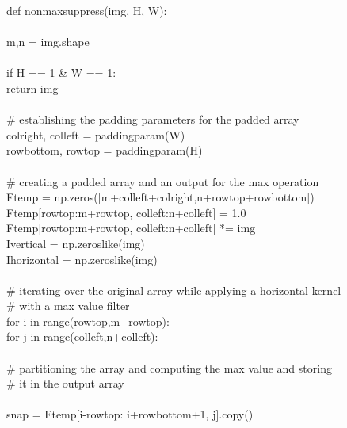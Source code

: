 \documentclass{article}
\begin{document}
	\noindent def non\textunderscore max\textunderscore suppress(img, H, W):\\
	\\
	\indent m,n = img.shape\\
	\\
	\indent if H == 1 \& W == 1:\\
	\indent \indent return img\\
	\\
	\indent \# establishing the padding parameters for the padded array\\   
	\indent col\textunderscore right, col\textunderscore left = padding\textunderscore param(W)\\
	\indent row\textunderscore bottom, row\textunderscore top = padding\textunderscore param(H)\\
	\\
	\indent \# creating a padded array and an output for the max operation\\
	\indent F\textunderscore temp = np.zeros([m+col\textunderscore left+col\textunderscore right,n+row\textunderscore top+row\textunderscore bottom])\\
	\indent F\textunderscore temp[row\textunderscore top:m+row\textunderscore top, col\textunderscore left:n+col\textunderscore left] = 1.0\\
	\indent F\textunderscore temp[row\textunderscore top:m+row\textunderscore top, col\textunderscore left:n+col\textunderscore left] *= img\\
	\indent I\textunderscore vertical = np.zeros\textunderscore like(img)\\
	\indent I\textunderscore horizontal = np.zeros\textunderscore like(img)\\
	\\
	\indent \# iterating over the original array while applying a horizontal kernel\\
	\indent \# with a max value filter\\
	\indent for i in range(row\textunderscore top,m+row\textunderscore top):\\
	\indent \indent for j in range(col\textunderscore left,n+col\textunderscore left):\\
	\\
	\indent \indent \indent \# partitioning the array and computing the max value and storing\\
	\indent \indent \indent \# it in the output array\\
	\\
	\indent \indent \indent snap = F\textunderscore temp[i-row\textunderscore top: i+row\textunderscore bottom+1, j].copy()\\
\end{document}
